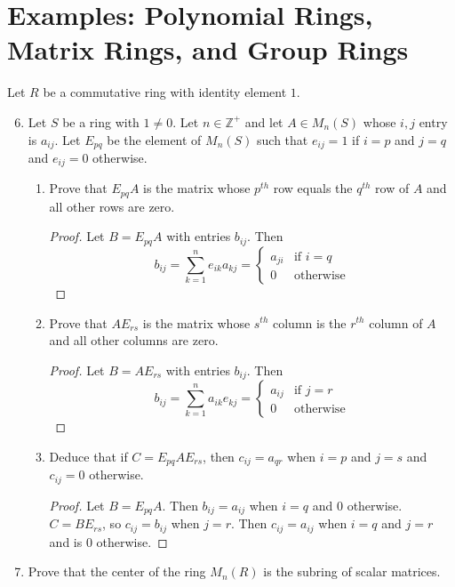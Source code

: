 \documentclass{report}
\newcommand{\Z}{\mathbb{Z}}
\begin{document}
\section{Examples: Polynomial Rings, Matrix Rings, and Group Rings}
Let $R$ be a commutative ring with identity element $1$.
\begin{enumerate}
    \setcounter{enumi}{5}
    \item Let $S$ be a ring with $1\neq 0$. Let $n\in\Z^+$ and let $A\in M_n(S)$ whose $i,j$ entry is $a_{ij}$. Let $E_{pq}$ be the element of $M_n(S)$ such that $e_{ij}=1$ if $i=p$ and $j=q$ and $e_{ij}=0$ otherwise.
    \begin{enumerate}
        \item Prove that $E_{pq}A$ is the matrix whose $p^{th}$ row equals the $q^{th}$ row of $A$ and all other rows are zero.
        \begin{proof}
            Let $B=E_{pq}A$ with entries $b_{ij}$. Then 
            $$b_{ij}=\sum_{k=1}^n e_{ik}a_{kj}=\begin{cases}
                a_{ji} & \text{if }i=q\\
                0 & \text{otherwise}
            \end{cases}
            $$
        \end{proof}
        \item Prove that $AE_{rs}$ is the matrix whose $s^{th}$ column is the $r^{th}$ column of $A$ and all other columns are zero.
        \begin{proof}
            Let $B=AE_{rs}$ with entries $b_{ij}$. Then 
            $$b_{ij}=\sum_{k=1}^n a_{ik}e_{kj}=\begin{cases}
                a_{ij} & \text{if }j=r\\
                0 & \text{otherwise}
            \end{cases}
            $$
        \end{proof}
        \item Deduce that if $C= E_{pq}AE_{rs}$, then $c_{ij}=a_{qr}$ when $i=p$ and $j=s$ and $c_{ij}=0$ otherwise.
        \begin{proof}
            Let $B=E_{pq}A$. Then $b_{ij}=a_{ij}$ when $i=q$ and $0$ otherwise. $C=BE_{rs}$, so $c_{ij}=b_{ij}$ when $j=r$. Then $c_{ij}=a_{ij}$ when $i=q$ and $j=r$ and is $0$ otherwise.
        \end{proof}
    \end{enumerate}
    \item Prove that the center of the ring $M_n(R)$ is the subring of scalar matrices.

\end{enumerate}
\end{document}
